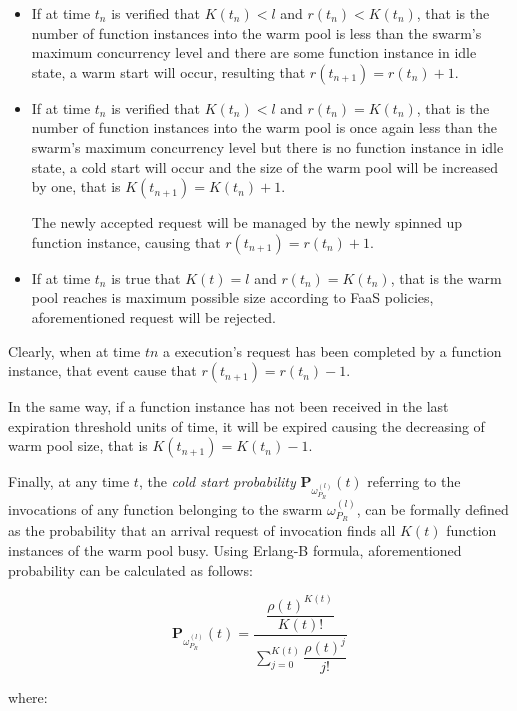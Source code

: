 \documentclass[12pt,a4paper]{report}
\begin{document}
\begin{itemize}
	\item If at time $t_n$ is verified that $K(t_n) < l$ and $r(t_n) < K(t_n)$, that is the number of function instances into the warm pool is less than the swarm's maximum concurrency level and there are some function instance in idle state, a warm start will occur, resulting that $r(t_{n+1}) = r(t_n) + 1$.
	
	
	\item If at time $t_n$ is verified that $K(t_n) < l$ and $r(t_n) = K(t_n)$, that is the number of function instances into the warm pool is once again less than the swarm's maximum concurrency level but there is no function instance in idle state, a cold start will occur and the size of the warm pool will be increased by one, that is $K(t_{n+1}) = K(t_n) + 1$.
	
	The newly accepted request will be managed by the newly spinned up function instance, causing that $r(t_{n+1}) = r(t_n) + 1$.
	
	\item If at time $t_n$ is true that $K(t) = l$ and $r(t_n) = K(t_n)$, that is the warm pool reaches is maximum possible size according to FaaS policies, aforementioned request will be rejected.
\end{itemize}

Clearly, when at time $tn$ a execution's request has been completed by a function instance, that event cause that $r(t_{n+1}) = r(t_n) - 1$. 

In the same way, if a function instance has not been received in the last expiration threshold units of time, it will be expired causing the decreasing of warm pool size, that is $K(t_{n+1}) = K(t_n) -1$.

Finally, at any time $t$, the \textit{cold start probability} $\textbf{P}_{\omega_{P_R}^{(l)}}(t)$ referring to the invocations of any function belonging to the swarm $\omega_{P_R}^{(l)}$, can be formally defined as the probability that an arrival request of invocation finds all $K(t)$ function instances of the warm pool busy. Using Erlang-B formula, aforementioned probability can be calculated as follows:

\begin{equation}
	\displaystyle \textbf{P}_{\omega_{P_R}^{(l)}}(t) = \dfrac{\dfrac{\rho(t)^{K(t)}}{K(t)!}}{\displaystyle\sum_{j=0}^{K(t)} \dfrac{\rho(t)^j}{j!}}
\end{equation}

where:
\end{document}
